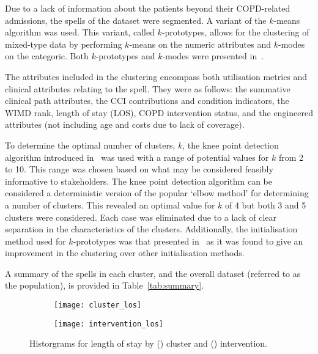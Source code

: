 Due to a lack of information about the patients beyond their COPD-related
admissions, the spells of the dataset were segmented. A variant of the
\(k\)-means algorithm was used. This variant, called \(k\)-prototypes, allows
for the clustering of mixed-type data by performing \(k\)-means on the numeric
attributes and \(k\)-modes on the categoric. Both \(k\)-prototypes and
\(k\)-modes were presented in~\cite{Huang1998}.

The attributes included in the clustering encompass both utilisation metrics and
clinical attributes relating to the spell. They were as follows: the summative
clinical path attributes, the CCI contributions and condition indicators, the
WIMD rank, length of stay (LOS), COPD intervention status, and the engineered
attributes (not including age and costs due to lack of coverage).

To determine the optimal number of clusters, \(k\), the knee point detection
algorithm introduced in~\cite{Satopaa2011} was used with a range of potential
values for \(k\) from 2 to 10. This range was chosen based on what may be
considered feasibly informative to stakeholders. The knee point detection
algorithm can be considered a deterministic version of the popular `elbow
method' for determining a number of clusters. This revealed an optimal value for
\(k\) of 4 but both 3 and 5 clusters were considered. Each case was eliminated
due to a lack of clear separation in the characteristics of the clusters.
Additionally, the initialisation method used for \(k\)-prototypes was that
presented in~\cite{Wilde2020} as it was found to give an improvement in the
clustering over other initialisation methods.

\begin{table}
    \centering
    \resizebox{\textwidth}{!}{%
        
    }\caption{%
        A summary of clinical and condition-specific characteristics for each
        cluster and the population.
    }\label{tab:summary}
\end{table}

A summary of the spells in each cluster, and the overall dataset (referred to as
the population), is provided in Table~\ref{tab:summary}. 

\begin{figure}
    \centering
    \begin{subfigure}{\halfimgwidth}
        \texttt{[image: cluster\_los]}
        \caption{}\label{fig:cluster_los}
    \end{subfigure}\hfill%
    \begin{subfigure}{\halfimgwidth}
        \texttt{[image: intervention\_los]}
        \caption{}\label{fig:intervention_los}
    \end{subfigure}
    \caption{%
        Historgrams for length of stay by () cluster and
        () intervention.
    }\label{fig:los_kde}
\end{figure}

